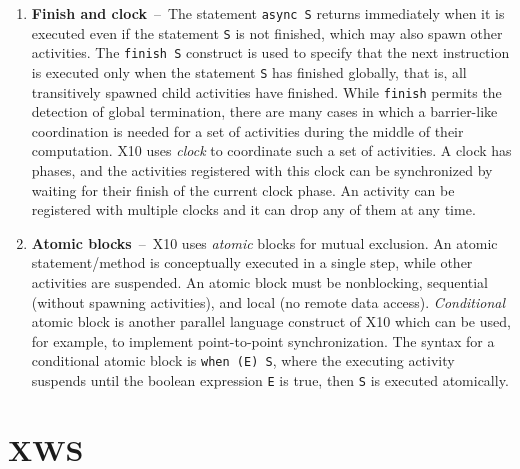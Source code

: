 \documentclass[10pt]{article}
\numberwithin{equation}{section}
\def\Xten{{\sf X10}}
\def\XWS{{\sf XWS}}
\begin{document}
\begin{enumerate}
\item{\bf Finish and clock}~--~The statement {\tt async S} returns immediately when it is executed even if the statement {\tt S} is not finished, which may also spawn other activities. The {\tt finish S} construct is used to specify that the next instruction is executed only when the statement {\tt S} has finished globally, that is, all transitively spawned child activities have finished.
While {\tt finish} permits the detection of global termination, there are many cases in which a barrier-like coordination is needed for a set of activities during the middle of their computation. \Xten{} uses {\em clock} to coordinate such a set of activities. A clock has phases, and the activities registered with this clock can be synchronized by waiting for their finish of the current clock phase. An activity can be registered with multiple clocks and it can drop any of them at any time.
\item{\bf Atomic blocks}~--~\Xten{} uses {\em atomic} blocks for mutual exclusion. An atomic statement/method is conceptually executed in a single step, while other activities are suspended. An atomic block must be nonblocking, sequential (without spawning activities), and local (no remote data access). %
{\em Conditional} atomic block is another parallel language construct of \Xten{} which can be used, for example, to implement point-to-point synchronization. The syntax for a conditional atomic block is {\tt when (E) S}, where the executing activity suspends until the boolean expression {\tt E} is true, then {\tt S} is executed atomically. 
\end{enumerate}

\section{\XWS}
\label{s:runtime}
\end{document}
